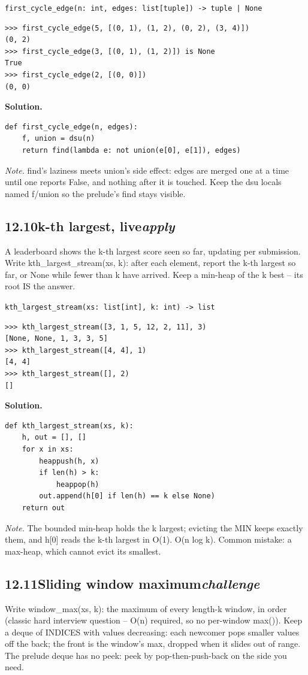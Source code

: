\documentclass[10pt,letterpaper]{book}
\begin{document}
\noindent\texttt{first\_cycle\_edge(n: int, edges: list[tuple]) -> tuple | None}
\begin{lstlisting}[style=ex]
>>> first_cycle_edge(5, [(0, 1), (1, 2), (0, 2), (3, 4)])
(0, 2)
>>> first_cycle_edge(3, [(0, 1), (1, 2)]) is None
True
>>> first_cycle_edge(2, [(0, 0)])
(0, 0)
\end{lstlisting}
\noindent\textbf{Solution.}
\begin{lstlisting}[style=code]
def first_cycle_edge(n, edges):
    f, union = dsu(n)
    return find(lambda e: not union(e[0], e[1]), edges)
\end{lstlisting}
\noindent\textit{Note.} find's laziness meets union's side effect: edges are merged one at a time until one reports False, and nothing after it is touched. Keep the dsu locals named f/union so the prelude's find stays visible.

\subsection*{12.10\quad k-th largest, live\hfill\textnormal{\textit{apply}}}
A leaderboard shows the k-th largest score seen so far, updating per submission. Write kth\_largest\_stream(xs, k): after each element, report the k-th largest so far, or None while fewer than k have arrived. Keep a min-heap of the k best -- its root IS the answer.

\noindent\texttt{kth\_largest\_stream(xs: list[int], k: int) -> list}
\begin{lstlisting}[style=ex]
>>> kth_largest_stream([3, 1, 5, 12, 2, 11], 3)
[None, None, 1, 3, 3, 5]
>>> kth_largest_stream([4, 4], 1)
[4, 4]
>>> kth_largest_stream([], 2)
[]
\end{lstlisting}
\noindent\textbf{Solution.}
\begin{lstlisting}[style=code]
def kth_largest_stream(xs, k):
    h, out = [], []
    for x in xs:
        heappush(h, x)
        if len(h) > k:
            heappop(h)
        out.append(h[0] if len(h) == k else None)
    return out
\end{lstlisting}
\noindent\textit{Note.} The bounded min-heap holds the k largest; evicting the MIN keeps exactly them, and h[0] reads the k-th largest in O(1). O(n log k). Common mistake: a max-heap, which cannot evict its smallest.

\subsection*{12.11\quad Sliding window maximum\hfill\textnormal{\textit{challenge}}}
Write window\_max(xs, k): the maximum of every length-k window, in order (classic hard interview question -- O(n) required, so no per-window max()). Keep a deque of INDICES with values decreasing: each newcomer pops smaller values off the back; the front is the window's max, dropped when it slides out of range. The prelude deque has no peek: peek by pop-then-push-back on the side you need.
\end{document}
